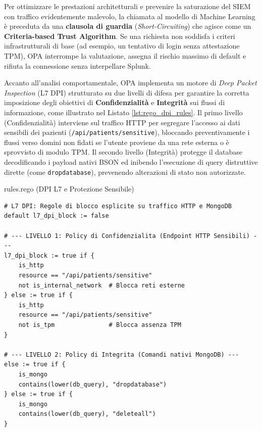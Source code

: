 Per ottimizzare le prestazioni architetturali e prevenire la saturazione del SIEM con traffico evidentemente malevolo, la chiamata al modello di Machine Learning è preceduta da una \textbf{clausola di guardia} (\textit{Short-Circuiting}) che agisce come un \textbf{Criteria-based Trust Algorithm}. Se una richiesta non soddisfa i criteri infrastrutturali di base (ad esempio, un tentativo di login senza attestazione TPM), OPA interrompe la valutazione, assegna il rischio massimo di default e rifiuta la connessione senza interpellare Splunk.

Accanto all'analisi comportamentale, OPA implementa un motore di \textit{Deep Packet Inspection} (L7 DPI) strutturato su due livelli di difesa per garantire la corretta imposizione degli obiettivi di \textbf{Confidenzialità} e \textbf{Integrità} sui flussi di informazione, come illustrato nel Listato \ref{lst:rego_dpi_rules}. Il primo livello (Confidenzialità) interviene sul traffico HTTP per segregare l'accesso ai dati sensibili dei pazienti (\texttt{/api/patients/sensitive}), bloccando preventivamente i flussi verso domini non fidati se l'utente proviene da una rete esterna o è sprovvisto di modulo TPM. Il secondo livello (Integrità) protegge il database decodificando i payload nativi BSON ed inibendo l'esecuzione di query distruttive dirette (come \texttt{dropdatabase}), prevenendo alterazioni di stato non autorizzate.

\begin{center}
\begin{minipage}{\linewidth}
\begin{ztacodebox}{rules.rego (DPI L7 e Protezione Sensibile)}
\begin{lstlisting}[language=Rego]
# L7 DPI: Regole di blocco esplicite su traffico HTTP e MongoDB
default l7_dpi_block := false

# --- LIVELLO 1: Policy di Confidenzialita (Endpoint HTTP Sensibili) ---
l7_dpi_block := true if {
    is_http
    resource == "/api/patients/sensitive"
    not is_internal_network  # Blocca reti esterne
} else := true if {
    is_http
    resource == "/api/patients/sensitive"
    not is_tpm               # Blocca assenza TPM
} 

# --- LIVELLO 2: Policy di Integrita (Comandi nativi MongoDB) ---
else := true if {
    is_mongo
    contains(lower(db_query), "dropdatabase")
} else := true if {
    is_mongo
    contains(lower(db_query), "deleteall")
}
\end{lstlisting}
\end{ztacodebox}
\label{lst:rego_dpi_rules}
\end{minipage}
\end{center}

